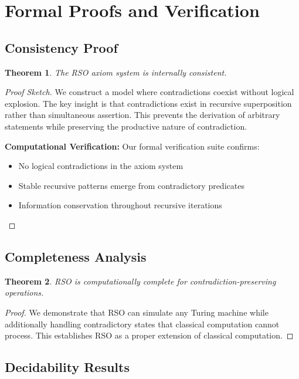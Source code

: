 \documentclass[11pt,a4paper]{article}
\newtheorem{theorem}{Theorem}[section]
\begin{document}
\section{Formal Proofs and Verification}

\subsection{Consistency Proof}

\begin{theorem}
The RSO axiom system is internally consistent.
\end{theorem}

\begin{proof}[Proof Sketch]
We construct a model where contradictions coexist without logical explosion. The key insight is that contradictions exist in recursive superposition rather than simultaneous assertion. This prevents the derivation of arbitrary statements while preserving the productive nature of contradiction.

\textbf{Computational Verification:} Our formal verification suite confirms:
\begin{itemize}
    \item No logical contradictions in the axiom system
    \item Stable recursive patterns emerge from contradictory predicates
    \item Information conservation throughout recursive iterations
\end{itemize}
\end{proof}

\subsection{Completeness Analysis}

\begin{theorem}
RSO is computationally complete for contradiction-preserving operations.
\end{theorem}

\begin{proof}
We demonstrate that RSO can simulate any Turing machine while additionally handling contradictory states that classical computation cannot process. This establishes RSO as a proper extension of classical computation.
\end{proof}

\subsection{Decidability Results}
\end{document}
